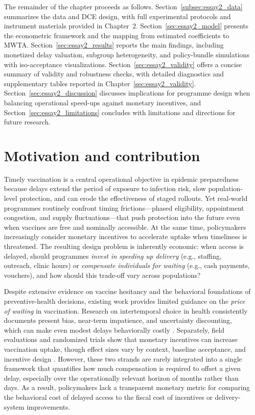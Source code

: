 \documentclass[doublespacing]{utdthesis}
\let\cite=\citep
\begin{document}
The remainder of the chapter proceeds as follows. Section~\ref{subsec:essay2_data} summarizes the data and DCE design, with full experimental protocols and instrument materials provided in Chapter~2. Section~\ref{sec:essay2_model} presents the econometric framework and the mapping from estimated coefficients to MWTA. Section~\ref{sec:essay2_results} reports the main findings, including monetized delay valuation, subgroup heterogeneity, and policy-bundle simulations with iso-acceptance visualizations. Section~\ref{sec:essay2_validity} offers a concise summary of validity and robustness checks, with detailed diagnostics and supplementary tables reported in Chapter~\ref{sec:essay2_validity}. Section~\ref{sec:essay2_discussion} discusses implications for programme design when balancing operational speed-ups against monetary incentives, and Section~\ref{sec:essay2_limitations} concludes with limitations and directions for future research.



\section{Motivation and contribution}
\label{subsec:essay2_motivation}

Timely vaccination is a central operational objective in epidemic preparedness because delays extend the period of exposure to infection risk, slow population-level protection, and can erode the effectiveness of staged rollouts. Yet real-world programmes routinely confront timing frictions---phased eligibility, appointment congestion, and supply fluctuations---that push protection into the future even when vaccines are free and nominally accessible. At the same time, policymakers increasingly consider monetary incentives to accelerate uptake when timeliness is threatened. The resulting design problem is inherently economic: when access is delayed, should programmes \emph{invest in speeding up delivery} (e.g., staffing, outreach, clinic hours) or \emph{compensate individuals for waiting} (e.g., cash payments, vouchers), and how should this trade-off vary across populations?

Despite extensive evidence on vaccine hesitancy and the behavioral foundations of preventive-health decisions, existing work provides limited guidance on the \emph{price of waiting} in vaccination. Research on intertemporal choice in health consistently documents present bias, near-term impatience, and uncertainty discounting, which can make even modest delays behaviorally costly \cite{Laibson1997,ODonoghueRabin2001,AttemaBleichrodt2013,Attema2018}. Separately, field evaluations and randomized trials show that monetary incentives can increase vaccination uptake, though effect sizes vary by context, baseline acceptance, and incentive design \cite{CamposMercade2021,Yip2022,Kim2022,Li2023,Shen2024}. However, these two strands are rarely integrated into a single framework that quantifies how much compensation is required to offset a given delay, especially over the operationally relevant horizon of months rather than days. As a result, policymakers lack a transparent monetary metric for comparing the behavioral cost of delayed access to the fiscal cost of incentives or delivery-system improvements.
\end{document}

